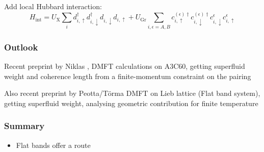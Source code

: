 \documentclass[aspectratio=169]{beamer}
\begin{document}
\begin{frame}
	Add local Hubbard interaction:
	\begin{equation}
		H_{\mathrm{int}} = U_{\mathrm{X}} \sum_{i} d_{i, \uparrow}^{\dagger} d_{i, \downarrow}^{\dagger} d_{i, \downarrow} d_{i, \uparrow}
		+ U_{\mathrm{Gr}} \sum_{i, \epsilon=A, B} c_{i, \uparrow}^{(\epsilon) \dagger} c_{i, \downarrow}^{(\epsilon) \dagger} c_{i, \downarrow}^{\epsilon} c_{i, \uparrow}^{\epsilon}
	\end{equation}
\end{frame}
	
\begin{frame}
	\frametitle{Outlook}
	
	Recent preprint by Niklas \cite{wittBypassingLatticeBCSBEC2024}, DMFT calculations on A3C60, getting superfluid weight and coherence length from a finite-momentum constraint on the pairing 
	
	Also recent preprint by Peotta/Törma \cite{penttilaFlatbandRatioQuantum2024} DMFT on Lieb lattice (Flat band system), getting superfluid weight, analysing geometric contribution for finite temperature
\end{frame}




\begin{frame}
	\frametitle{Summary}
	
	\begin{itemize}
		\item Flat bands offer a route
	\end{itemize}

\end{frame}
\end{document}
